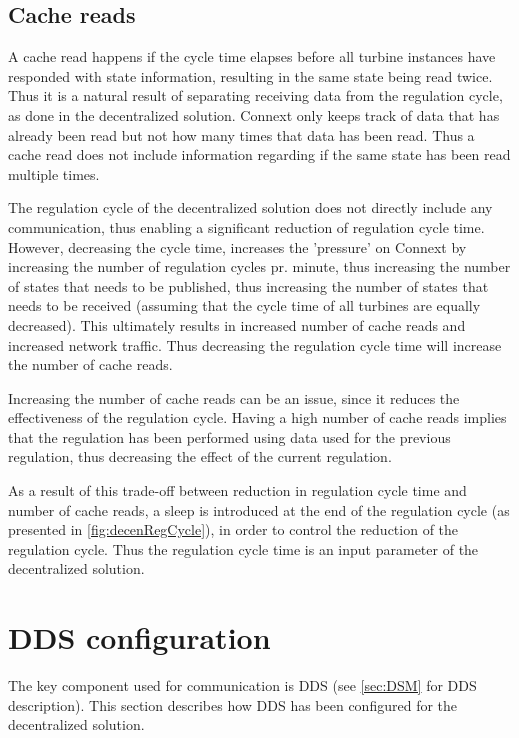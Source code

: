 \subsection{Cache reads}\label{sec:cachereads}

A cache read happens if the cycle time elapses before all turbine instances have responded with state information, resulting in the same state being read twice. Thus it is a natural result of separating receiving data from the regulation cycle, as done in the decentralized solution. Connext only keeps track of data that has already been read but not how many times that data has been read. Thus a cache read does not include information regarding if the same state has been read multiple times.

The regulation cycle of the decentralized solution does not directly include any communication, thus enabling a significant reduction of regulation cycle time. However, decreasing the cycle time, increases the 'pressure' on Connext by increasing the number of regulation cycles pr. minute, thus increasing the number of states that needs to be published, thus increasing the number of states that needs to be received (assuming that the cycle time of all turbines are equally decreased). This ultimately results in increased number of cache reads and increased network traffic. Thus decreasing the regulation cycle time will increase the number of cache reads.  

Increasing the number of cache reads can be an issue, since it reduces the effectiveness of the regulation cycle. Having a high number of cache reads implies that the regulation has been performed using data used for the previous regulation, thus decreasing the effect of the current regulation.

As a result of this trade-off between reduction in regulation cycle time and number of cache reads, a sleep is introduced at the end of the regulation cycle (as presented in \cref{fig:decenRegCycle}), in order to control the reduction of the regulation cycle. Thus the regulation cycle time is an input parameter of the decentralized solution.

\section{DDS configuration} \label{sec:decen:ddsconf}

The key component used for communication is DDS (see \cref{sec:DSM} for DDS description). This section describes how DDS has been configured for the decentralized solution.


